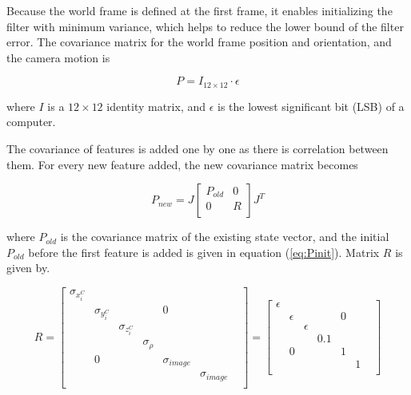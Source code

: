 Because the world frame is defined at the first frame, it enables 
initializing the filter with minimum variance, which helps to reduce the 
lower bound of the filter error. The covariance matrix for the world frame
position and orientation, and the camera motion is 

\begin{equation}
\label{eq:Pinit}
P=I_{12\times 12}\cdot \epsilon 
\end{equation}

\noindent where $I$ is a $12\times12$ identity matrix, and $\epsilon $
is the lowest significant bit (LSB) of a computer.

The covariance of features is added one by one as there is 
correlation between them. For every new feature added, the new 
covariance matrix becomes

\begin{equation}
\label{eq:Pnew}
P_{new}=J\begin{bmatrix}
P_{old} & 0 \\
0 & R \\
\end{bmatrix}
J^{T}
\end{equation}

\noindent where $P_{old}$ is the covariance matrix of the existing state vector, 
and the initial $P_{old}$ before the first feature is added is given
in equation (\ref{eq:Pinit}). Matrix $R$ is given by.

\begin{equation}
\label{eq:R}
R=\begin{bmatrix}
\sigma _{x_{i}^{C}} & & & & & & \\
 & \sigma _{y_{i}^{C}} & & & 0 & & \\
 & & \sigma _{z_{i}^{C}} & & & & \\
 & & & \sigma _{\rho } & & & \\
 & 0 & & & \sigma _{image} & & \\
 & & & & & \sigma _{image} & \\
\end{bmatrix}
 = \begin{bmatrix}
\epsilon & & & & & & \\
 & \epsilon & & & 0 & & \\
 & & \epsilon & & & & \\
 & & & 0.1 & & & \\
 & 0 & & & 1 & & \\
 & & & & & 1 & \\
\end{bmatrix} 
\end{equation}

